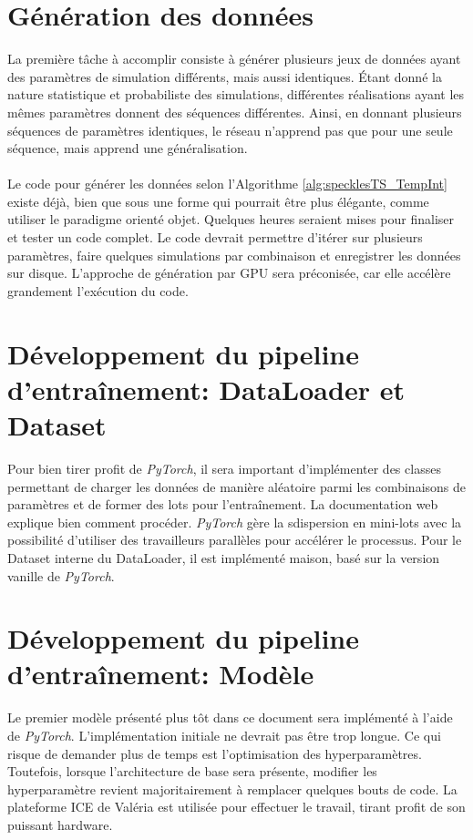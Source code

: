 \documentclass[MSc,french]{ulthese}
\begin{document}
\section{Génération des données}
La première tâche à accomplir consiste à générer plusieurs jeux de données ayant des paramètres de simulation différents, mais aussi identiques. Étant donné la nature statistique et probabiliste des simulations, différentes réalisations ayant les mêmes paramètres donnent des séquences différentes. Ainsi, en donnant plusieurs séquences de paramètres identiques, le réseau n'apprend pas que pour une seule séquence, mais apprend une généralisation.
\\ \\
Le code pour générer les données selon l'Algorithme \ref{alg:specklesTS_TempInt} existe déjà, bien que sous une forme qui pourrait être plus élégante, comme utiliser le paradigme orienté objet. Quelques heures seraient mises pour finaliser et tester un code complet. Le code devrait permettre d'itérer sur plusieurs paramètres, faire quelques simulations par combinaison et enregistrer les données sur disque. L'approche de génération par GPU sera préconisée, car elle accélère grandement l'exécution du code.
\section{Développement du pipeline d'entraînement: DataLoader et Dataset}
Pour bien tirer profit de \textit{PyTorch}, il sera important d'implémenter des classes permettant de charger les données de manière aléatoire parmi les combinaisons de paramètres et de former des lots pour l'entraînement. La documentation web explique bien comment procéder. \textit{PyTorch} gère la sdispersion en mini-lots avec la possibilité d'utiliser des travailleurs parallèles pour accélérer le processus. Pour le Dataset interne du DataLoader, il est implémenté maison, basé sur la version vanille de \textit{PyTorch}.
\section{Développement du pipeline d'entraînement: Modèle}
Le premier modèle présenté plus tôt dans ce document sera implémenté à l'aide de \textit{PyTorch}. L'implémentation initiale ne devrait pas être trop longue. Ce qui risque de demander plus de temps est l'optimisation des hyperparamètres. Toutefois, lorsque l'architecture de base sera présente, modifier les hyperparamètre revient majoritairement à remplacer quelques bouts de code. La plateforme ICE de Valéria est utilisée pour effectuer le travail, tirant profit de son puissant hardware.
\end{document}
